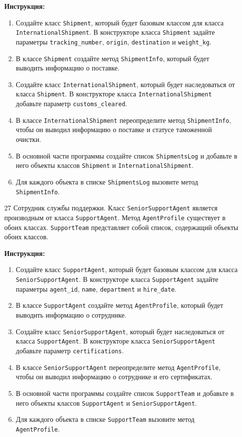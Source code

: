 \begin{enumerate}
\textbf{Инструкция:}
\begin{enumerate}
    \item Создайте класс \texttt{Shipment}, который будет базовым классом для класса \texttt{InternationalShipment}. В конструкторе класса \texttt{Shipment} задайте параметры \texttt{tracking\_number}, \texttt{origin}, \texttt{destination} и \texttt{weight\_kg}.
    \item В классе \texttt{Shipment} создайте метод \texttt{ShipmentInfo}, который будет выводить информацию о поставке.
    \item Создайте класс \texttt{InternationalShipment}, который будет наследоваться от класса \texttt{Shipment}. В конструкторе класса \texttt{InternationalShipment} добавьте параметр \texttt{customs\_cleared}.
    \item В классе \texttt{InternationalShipment} переопределите метод \texttt{ShipmentInfo}, чтобы он выводил информацию о поставке и статусе таможенной очистки.
    \item В основной части программы создайте список \texttt{ShipmentsLog} и добавьте в него объекты классов \texttt{Shipment} и \texttt{InternationalShipment}.
    \item Для каждого объекта в списке \texttt{ShipmentsLog} вызовите метод \texttt{ShipmentInfo}.
\end{enumerate}

\item[27]
Сотрудник службы поддержки. Класс \texttt{SeniorSupportAgent} является производным от класса \texttt{SupportAgent}. Метод \texttt{AgentProfile} существует в обоих классах. \texttt{SupportTeam} представляет собой список, содержащий объекты обоих классов.

\textbf{Инструкция:}
\begin{enumerate}
    \item Создайте класс \texttt{SupportAgent}, который будет базовым классом для класса \texttt{SeniorSupportAgent}. В конструкторе класса \texttt{SupportAgent} задайте параметры \texttt{agent\_id}, \texttt{name}, \texttt{department} и \texttt{hire\_date}.
    \item В классе \texttt{SupportAgent} создайте метод \texttt{AgentProfile}, который будет выводить информацию о сотруднике.
    \item Создайте класс \texttt{SeniorSupportAgent}, который будет наследоваться от класса \texttt{SupportAgent}. В конструкторе класса \texttt{SeniorSupportAgent} добавьте параметр \texttt{certifications}.
    \item В классе \texttt{SeniorSupportAgent} переопределите метод \texttt{AgentProfile}, чтобы он выводил информацию о сотруднике и его сертификатах.
    \item В основной части программы создайте список \texttt{SupportTeam} и добавьте в него объекты классов \texttt{SupportAgent} и \texttt{SeniorSupportAgent}.
    \item Для каждого объекта в списке \texttt{SupportTeam} вызовите метод \texttt{AgentProfile}.
\end{enumerate}


\end{enumerate}
